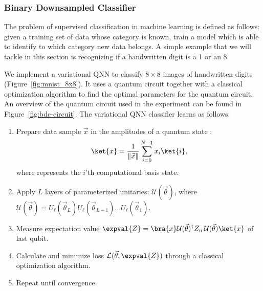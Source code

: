 \documentclass[a4paper,10pt]{article}
\begin{document}
\subsubsection{Binary Downsampled Classifier} \label{sec:bdc}
The problem of supervised classification in machine learning is defined as follows: given a training set of data whose category is known, train a model which is able to identify to which category new data belongs.
A simple example that we will tackle in this section is recognizing if a handwritten digit is a 1 or an 8.

We implement a variational QNN to classify $8 \times 8$ images of handwritten digits (Figure~\ref{fig:mnist_8x8}).
It uses a quantum circuit together with a classical optimization algorithm to find the optimal parameters for the quantum circuit.
An overview of the quantum circuit used in the experiment can be found in Figure~\ref{fig:bdc-circuit}.
The variational QNN classifier learns as follows:
\begin{enumerate}
	\item Prepare data sample $\vec{x}$ in the amplitudes of a quantum state :
	\begin{equation}
	 \ket{x} = \dfrac{1}{\lVert\vec{x}\rVert}\sum_{i=0}^{N-1} x_i\ket{i},
	\end{equation}
	where  represents the $i$'th computational basis state.
	\item Apply $L$ layers of parameterized unitaries: $\mathcal{U}(\vec{\theta})$, where $\mathcal{U}(\vec{\theta}) = U_\ell(\vec{\theta}_L) U_\ell(\vec{\theta}_{L-1}) \ldots U_\ell(\vec{\theta}_1)$.
	\item Measure expectation value $\expval{Z} = \bra{x}\mathcal{U}(\vec{\theta})^\dagger Z_n\, \mathcal{U}(\vec{\theta})\ket{x}$ of last qubit.
	\item Calculate and minimize loss $\mathcal{L}(\vec{\theta}, \expval{Z})$ through a classical optimization algorithm.
	\item Repeat until convergence.
\end{enumerate}
\end{document}
